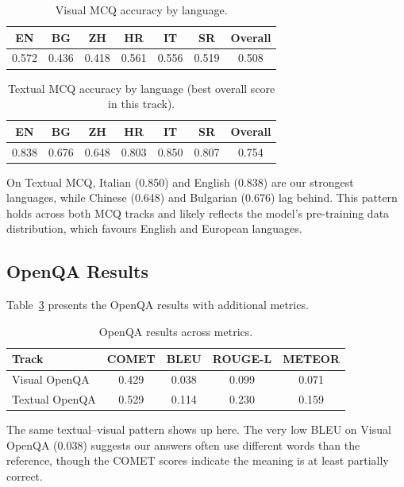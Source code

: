 \documentclass[]{ceurart}
\begin{document}
\begin{table}[t]
\centering
\caption{Visual MCQ accuracy by language.}
\label{tab:lang_visual_mcq}
\begin{tabular}{ccccccc}
\toprule
EN & BG & ZH & HR & IT & SR & \textbf{Overall} \\
\midrule
0.572 & 0.436 & 0.418 & 0.561 & 0.556 & 0.519 & 0.508 \\
\bottomrule
\end{tabular}
\end{table}

\begin{table}[t]
\centering
\caption{Textual MCQ accuracy by language (best overall score in this track).}
\label{tab:lang_text_mcq}
\begin{tabular}{ccccccc}
\toprule
EN & BG & ZH & HR & IT & SR & \textbf{Overall} \\
\midrule
0.838 & 0.676 & 0.648 & 0.803 & 0.850 & 0.807 & 0.754 \\
\bottomrule
\end{tabular}
\end{table}

On Textual MCQ, Italian (0.850) and English (0.838) are our strongest languages, while Chinese (0.648) and Bulgarian (0.676) lag behind.
This pattern holds across both MCQ tracks and likely reflects the model's pre-training data distribution, which favours English and European languages.

\subsection{OpenQA Results}
\label{sec:openqa_results}

Table~\ref{tab:openqa} presents the OpenQA results with additional metrics.

\begin{table}[t]
\centering
\caption{OpenQA results across metrics.}
\label{tab:openqa}
\begin{tabular}{lcccc}
\toprule
\textbf{Track} & \textbf{COMET} & \textbf{BLEU} & \textbf{ROUGE-L} & \textbf{METEOR} \\
\midrule
Visual OpenQA  & 0.429 & 0.038 & 0.099 & 0.071 \\
Textual OpenQA & 0.529 & 0.114 & 0.230 & 0.159 \\
\bottomrule
\end{tabular}
\end{table}

The same textual--visual pattern shows up here.
The very low BLEU on Visual OpenQA (0.038) suggests our answers often use different words than the reference, though the COMET scores indicate the meaning is at least partially correct.
\end{document}
